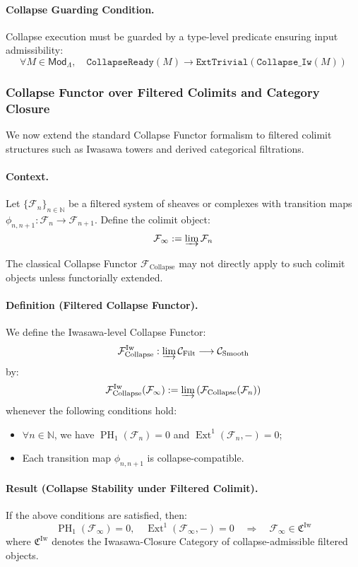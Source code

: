 \documentclass[11pt]{article}
\DeclareMathOperator{\Ext}{Ext}
\DeclareMathOperator{\PH}{PH}
\begin{document}
\paragraph{Collapse Guarding Condition.}
Collapse execution must be guarded by a type-level predicate ensuring input admissibility:
\[
\forall M \in \mathsf{Mod}_\Lambda, \quad \texttt{CollapseReady}(M) \to \texttt{ExtTrivial}(\texttt{Collapse\_Iw}(M))
\]

\subsubsection*{Collapse Functor over Filtered Colimits and Category Closure}

We now extend the standard Collapse Functor formalism to filtered colimit structures such as Iwasawa towers and derived categorical filtrations.

\paragraph{Context.}
Let $\{ \mathcal{F}_n \}_{n \in \mathbb{N}}$ be a filtered system of sheaves or complexes with transition maps $\phi_{n,n+1} : \mathcal{F}_n \to \mathcal{F}_{n+1}$. Define the colimit object:
\[
\mathcal{F}_\infty := \varinjlim \mathcal{F}_n
\]

The classical Collapse Functor $\mathcal{F}_{\mathrm{Collapse}}$ may not directly apply to such colimit objects unless functorially extended.

\paragraph{Definition (Filtered Collapse Functor).}
We define the Iwasawa-level Collapse Functor:
\[
\mathcal{F}_{\mathrm{Collapse}}^{\mathrm{Iw}} : \varinjlim \mathcal{C}_{\mathrm{Filt}} \longrightarrow \mathcal{C}_{\mathrm{Smooth}}
\]
by:
\[
\mathcal{F}_{\mathrm{Collapse}}^{\mathrm{Iw}}(\mathcal{F}_\infty) := \varinjlim \left( \mathcal{F}_{\mathrm{Collapse}}(\mathcal{F}_n) \right)
\]
whenever the following conditions hold:
\begin{itemize}
    \item $\forall n \in \mathbb{N}$, we have $\PH_1(\mathcal{F}_n) = 0$ and $\Ext^1(\mathcal{F}_n, -) = 0$;
    \item Each transition map $\phi_{n,n+1}$ is collapse-compatible.
\end{itemize}

\paragraph{Result (Collapse Stability under Filtered Colimit).}
If the above conditions are satisfied, then:
\[
\PH_1(\mathcal{F}_\infty) = 0, \quad \Ext^1(\mathcal{F}_\infty, -) = 0 \quad \Rightarrow \quad \mathcal{F}_\infty \in \mathfrak{C}^{\mathrm{Iw}}
\]
where $\mathfrak{C}^{\mathrm{Iw}}$ denotes the Iwasawa-Closure Category of collapse-admissible filtered objects.
\end{document}
